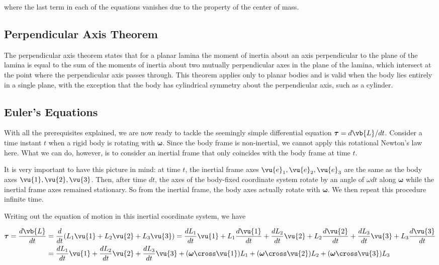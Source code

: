 \documentclass[a4paper,12pt]{report}
\begin{document}
where the last term in each of the equations vanishes due to the property of the center of mass.

\subsection{Perpendicular Axis Theorem}

The perpendicular axis theorem states that for a planar lamina the moment of inertia about an axis perpendicular to the plane of the lamina is equal to the sum of the moments of inertia about two mutually perpendicular axes in the plane of the lamina, which intersect at the point where the perpendicular axis passes through. This theorem applies only to planar bodies and is valid when the body lies entirely in a single plane, with the exception that the body has cylindrical symmetry about the perpendicular axis, such as a cylinder.

\subsection{Euler's Equations}
With all the prerequisites explained, we are now ready to tackle the seemingly simple differential equation \(\boldsymbol{\tau } = d \vb{L} /dt \). Consider a time instant \(t\) when a rigid body is rotating with \(\boldsymbol{\omega } \). Since the body frame is non-inertial, we cannot apply this rotational Newton's law here. What we can do, however, is to consider an inertial frame that only coincides with the body frame at time \(t\). 

It is very important to have this picture in mind: at time \(t\), the inertial frame axes \(\vu{e} _{1}, \vu{e} _{2}, \vu{e} _{3} \) are the same as the body axes \(\vu{1}, \vu{2},\vu{3} \). Then, after time \(dt\), the axes of the body-fixed coordinate system rotate by an angle of \(\omega dt\) along \(\boldsymbol{\omega } \) while the inertial frame axes remained stationary. So from the inertial frame, the body axes actually rotate with \(\boldsymbol{\omega } \). We then repeat this procedure infinite time.

Writing out the equation of motion in this inertial coordinate system, we have

\begin{equation}
	\begin{aligned}
		\boldsymbol{\tau } = \frac{d \vb{L}}{dt} &= \frac{d}{dt} (L_1 \vu{1} + L_2 \vu{2} + L_3 \vu{3}  ) = \frac{d L_1}{dt} \vu{1}  + L_{1} \frac{d \vu{1}}{dt} + \frac{d L_2}{dt} \vu{2}  + L_{2} \frac{d \vu{2}}{dt} + \frac{d L_3}{dt} \vu{3}  + L_{3} \frac{d \vu{3} }{dt}     \\ 
		&= \frac{d L_1}{dt} \vu{1}  + \frac{d L_2}{dt} \vu{2} + \frac{d L_3}{dt} \vu{3}   + (\boldsymbol{\omega } \cross \vu{1}  )L_{1} + (\boldsymbol{\omega } \cross \vu{2}  )L_{2}  + (\boldsymbol{\omega } \cross \vu{3}  )L_{3} 
	\end{aligned}
\end{equation}
\end{document}
